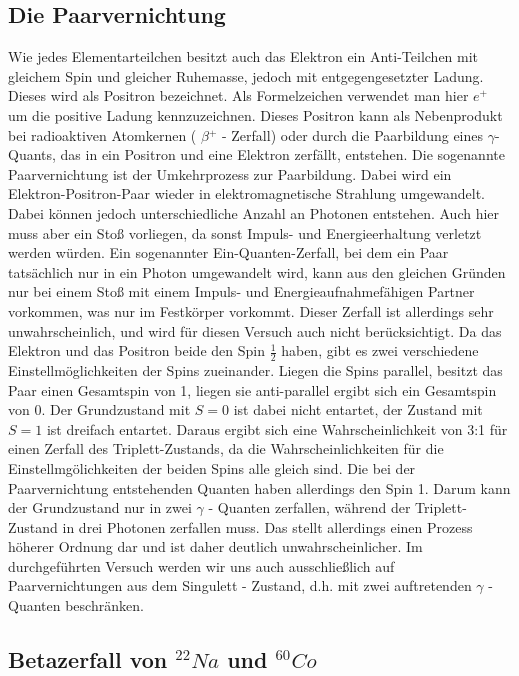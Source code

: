 \documentclass[11pt]{scrartcl}
\begin{document}
\subsection{Die Paarvernichtung}
Wie jedes Elementarteilchen besitzt auch das Elektron ein Anti-Teilchen mit gleichem Spin und gleicher Ruhemasse, jedoch mit entgegengesetzter Ladung. Dieses wird als Positron bezeichnet. Als Formelzeichen verwendet man hier $ e^{+} $ um die positive Ladung kennzuzeichnen. Dieses Positron kann als Nebenprodukt bei radioaktiven Atomkernen ( $\beta {^+} $ - Zerfall) oder durch die Paarbildung eines $\gamma $- Quants, das in ein Positron und eine Elektron zerfällt, entstehen. 
Die sogenannte Paarvernichtung ist der Umkehrprozess zur Paarbildung. Dabei wird ein Elektron-Positron-Paar wieder in elektromagnetische Strahlung umgewandelt. Dabei können jedoch unterschiedliche Anzahl an Photonen entstehen. Auch hier muss aber ein Stoß vorliegen, da sonst Impuls- und Energieerhaltung verletzt werden würden. Ein sogenannter Ein-Quanten-Zerfall, bei dem ein Paar tatsächlich nur in ein Photon umgewandelt wird, kann aus den gleichen Gründen nur bei einem Stoß mit einem Impuls- und Energieaufnahmefähigen Partner vorkommen, was nur im Festkörper vorkommt. Dieser Zerfall ist allerdings sehr unwahrscheinlich, und wird für diesen Versuch auch nicht berücksichtigt. 
Da das Elektron und das Positron beide den Spin $\frac{1}{2}$ haben, gibt es zwei verschiedene Einstellmöglichkeiten der Spins zueinander. Liegen die Spins parallel, besitzt das Paar einen Gesamtspin von 1, liegen sie anti-parallel ergibt sich ein Gesamtspin von 0. Der Grundzustand mit $S=0$ ist dabei nicht entartet, der Zustand mit $S=1$ ist dreifach entartet. Daraus ergibt sich eine Wahrscheinlichkeit von 3:1 für einen Zerfall des Triplett-Zustands, da die Wahrscheinlichkeiten für die Einstellmgölichkeiten der beiden Spins alle gleich sind. Die bei der Paarvernichtung entstehenden Quanten haben allerdings den Spin 1. Darum kann der Grundzustand nur in zwei $\gamma$ - Quanten zerfallen, während der Triplett-Zustand in drei Photonen zerfallen muss. Das stellt allerdings einen Prozess höherer Ordnung dar und ist daher deutlich unwahrscheinlicher. Im durchgeführten Versuch werden wir uns auch ausschließlich auf Paarvernichtungen aus dem Singulett - Zustand, d.h. mit zwei auftretenden $\gamma$ - Quanten beschränken.


\subsection{Betazerfall von $^{22}Na$ und $^{60}Co$}
\end{document}
